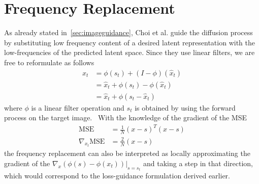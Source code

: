 \section{Frequency Replacement}
As already stated in~\ref{sec:imageguidance}, Choi et al. guide the diffusion process by substituting low frequency content of a desired latent representation with the low-frequencies of the predicted latent space. Since they use linear filters, we are free to reformulate as follows
\begin{align}
    \label{eq:ilvr}
    x_{t} & = \phi(s_{t}) + (I - \phi) (\hat{x}_{t})        \\
          & = \hat{x}_{t} + \phi(s_{t}) - \phi(\hat{x}_{t}) \\
          & = \hat{x}_{t} + \phi(s_{t} - \hat{x}_{t})
\end{align}
where $\phi$ is a linear filter operation and $s_t$ is obtained by using the forward process on the target image.~\autocite{choi2021ilvr} With the knowledge of the gradient of the MSE
\begin{align}
    \text{MSE}              & = \frac{1}{N} (x - s)^T (x - s) \\
    \nabla_{x_t} \text{MSE} & = \frac{2}{N} (x - s)
\end{align}
the frequency replacement can also be interpreted as locally approximating the gradient of the $\nabla_{x}(\phi(s) - \phi(x_{t}))|_{s=s_t}$ and taking a step in that direction, which would correspond to the loss-guidance formulation derived earlier.

